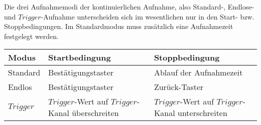 Die drei Aufnahmemodi der kontinuierlichen Aufnahme, also Standard-, Endlose- und $Trigger$-Aufnahme unterscheiden sich im wesentlichen nur in den Start- bzw. Stoppbedingungen. Im Standardmodus muss zusätzlich eine Aufnahmezeit festgelegt werden. 
\begin{table}[h]
	\begin{center}
		\begin{tabular}{l | l | l}
			Modus & Startbedingung & Stoppbedingung\\
			\hline
			Standard & Bestätigungstaster & Ablauf der Aufnahmezeit\\
			Endlos & Bestätigungstaster & Zurück-Taster\\
			$Trigger$ & $Trigger$-Wert auf $Trigger$-Kanal überschreiten & $Trigger$-Wert auf $Trigger$-Kanal unterschreiten
		\end{tabular}
	\end{center}
\end{table}
